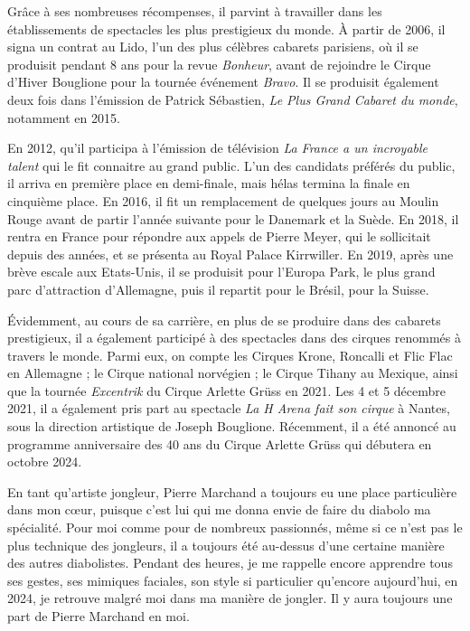 Grâce à ses nombreuses récompenses, il parvint à travailler dans les établissements de spectacles les plus prestigieux du monde. À partir de 2006, il signa un contrat au Lido, l'un des plus célèbres cabarets parisiens, où il se produisit pendant 8 ans pour la revue \textit{Bonheur}, avant de rejoindre le Cirque d'Hiver Bouglione pour la tournée événement \textit{Bravo}. Il se produisit également deux fois dans l'émission de Patrick Sébastien, \textit{Le Plus Grand Cabaret du monde}, notamment en 2015.

En 2012, qu'il participa à l'émission de télévision \textit{La France a un incroyable talent} qui le fit connaitre au grand public. L'un des candidats préférés du public, il arriva en première place en demi-finale, mais hélas termina la finale en cinquième place. En 2016, il fit un remplacement de quelques jours au Moulin Rouge avant de partir l'année suivante pour le Danemark et la Suède. En 2018, il rentra en France pour répondre aux appels de Pierre Meyer, qui le sollicitait depuis des années, et se présenta au Royal Palace Kirrwiller. En 2019, après une brève escale aux Etats-Unis, il se produisit pour l'Europa Park, le plus grand parc d'attraction d'Allemagne, puis il repartit pour le Brésil, pour la Suisse. 

Évidemment, au cours de sa carrière, en plus de se produire dans des cabarets prestigieux, il a également participé à des spectacles dans des cirques renommés à travers le monde. Parmi eux, on compte les Cirques Krone, Roncalli et Flic Flac en Allemagne ; le Cirque national norvégien ; le Cirque Tihany au Mexique, ainsi que la tournée \textit{Excentrik} du Cirque Arlette Grüss en 2021. Les 4 et 5 décembre 2021, il a également pris part au spectacle \textit{La H Arena fait son cirque} à Nantes, sous la direction artistique de Joseph Bouglione. Récemment, il a été annoncé au programme anniversaire des 40 ans du Cirque Arlette Grüss qui débutera en octobre 2024. 

En tant qu'artiste jongleur, Pierre Marchand a toujours eu une place particulière dans mon cœur, puisque c'est lui qui me donna envie de faire du diabolo ma spécialité. Pour moi comme pour de nombreux passionnés, même si ce n’est pas le plus technique des jongleurs, il a toujours été au-dessus d'une certaine manière des autres diabolistes. Pendant des heures, je me rappelle encore apprendre tous ses gestes, ses mimiques faciales, son style si particulier qu'encore aujourd'hui, en 2024, je retrouve malgré moi dans ma manière de jongler. Il y aura toujours une part de Pierre Marchand en moi.

